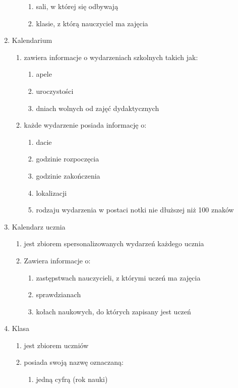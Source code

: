 \documentclass{article}
\begin{document}
\begin{enumerate}
\begin{enumerate}
\begin{enumerate}
      \item sali, w której się odbywają
      \item klasie, z którą nauczyciel ma zajęcia
    \end{enumerate}
\end{enumerate}
\item Kalendarium 
  \begin{enumerate}
    \item zawiera informacje o wydarzeniach szkolnych takich jak:
    \begin{enumerate}
      \item apele
      \item uroczystości
      \item dniach wolnych od zajęć dydaktycznych      
    \end{enumerate}
    \item każde wydarzenie posiada informację o:
    \begin{enumerate}
      \item dacie
      \item godzinie rozpoczęcia
      \item godzinie zakończenia
      \item lokalizacji
      \item rodzaju wydarzenia w postaci notki nie dłuższej niż 100 znaków
    \end{enumerate}
\end{enumerate}
\item Kalendarz ucznia 
  \begin{enumerate}
    \item jest zbiorem spersonalizowanych wydarzeń każdego ucznia
    \item Zawiera informacje o:
    \begin{enumerate}
      \item zastępstwach nauczycieli, z którymi uczeń ma zajęcia
      \item sprawdzianach
      \item kołach naukowych, do których zapisany jest uczeń
    \end{enumerate}
\end{enumerate}
\item Klasa
  \begin{enumerate}
    \item jest zbiorem uczniów
    \item posiada swoją nazwę oznaczaną:
    \begin{enumerate}
      \item jedną cyfrą (rok nauki)

\end{enumerate}
\end{enumerate}
\end{enumerate}
\end{document}
